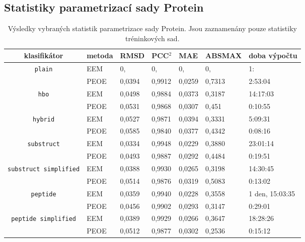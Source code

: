 \subsection*{Statistiky parametrizací sady Protein}
\label{proteinstat}
\begin{table}[h]
    \renewcommand{\arraystretch}{1.4}
    \centering
    \begin{tabular}{c|l|l|l|l|l|l}
         \textbf{klasifikátor} &  \textbf{metoda} & \textbf{RMSD} & \textbf{PCC$^2$} & \textbf{MAE} & \textbf{ABSMAX} & \textbf{doba výpočtu}\\
         \hline
         \multirow{2}{6em}{\texttt{plain}} & EEM & 0, & 0, & 0, & 0, & 1:  \\
         & PEOE & 0,0394 & 0,9912 & 0,0259 & 0,7313 & 2:53:04 \\
         \hline
         \multirow{2}{6em}{\texttt{hbo}} & EEM & 0,0498 & 0,9884 & 0,0373 & 0,3187 & 14:17:03 \\
         & PEOE & 0,0531 & 0,9868 & 0,0307 & 0,451 & 0:10:55 \\
         \hline
         \multirow{2}{6em}{\texttt{hybrid}} & EEM & 0,0527 & 0,9871 & 0,0394 & 0,3331 & 5:09:31 \\
         & PEOE & 0,0585 & 0,9840 & 0,0377 & 0,4342 & 0:08:16 \\
         \hline
         \multirow{2}{6em}{\texttt{substruct}} & EEM & 0,0334 & 0,9948 & 0,0229 & 0,3880 & 23:01:14 \\
         & PEOE & 0,0493 & 0,9887 & 0,0292 & 0,4484 & 0:19:51 \\
         \hline
         \multirow{2}{6em}{\texttt{substruct simplified}} & EEM & 0,0388 & 0,9930 & 0,0265 & 0,3198 & 14:30:45 \\
         & PEOE & 0,0514 & 0,9876 & 0,0319 & 0,5083 & 0:13:02 \\
         \hline
         \multirow{2}{6em}{\texttt{peptide}} & EEM & 0,0359 & 0,9940 & 0,0228 & 0,3558 & 1 den, 15:03:35 \\
         & PEOE & 0,0456 & 0,9902 & 0,0293 & 0,3147 & 0:29:01 \\
         \hline
         \multirow{2}{6em}{\texttt{peptide simplified}} & EEM & 0,0389 & 0,9929 & 0,0266 & 0,3647 & 18:28:26 \\
         & PEOE & 0,0512 & 0,9877 & 0,0302 & 0,2536 & 0:15:12
    \end{tabular}
    \caption{Výsledky vybraných statistik parametrizace sady Protein. Jsou zaznamenány pouze statistiky tréninkových sad.}
    \label{statistics_PDB}
\end{table}
\newpage
\medskip

